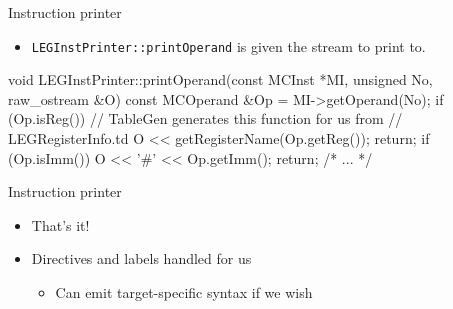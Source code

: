 
\begin{frame}[fragile]{Instruction printer}

\begin{itemize}
    \item \texttt{LEGInstPrinter::printOperand} is given the stream to print to.
\end{itemize}

\begin{codebox}
void LEGInstPrinter::printOperand(const MCInst *MI, unsigned No,
                                  raw_ostream &O) {
  const MCOperand &Op = MI->getOperand(No);
  if (Op.isReg()) {
    // TableGen generates this function for us from   
    // LEGRegisterInfo.td
    O << getRegisterName(Op.getReg());
    return;
  }
  if (Op.isImm()) {
    O << '#' << Op.getImm();
    return;
  }
  /* ... */
}
\end{codebox}

\end{frame}


\begin{frame}{Instruction printer}

\begin{itemize}
    \item That's it!
    \item Directives and labels handled for us
    \begin{itemize}
        \item Can emit target-specific syntax if we wish
    \end{itemize}
\end{itemize}


\end{frame}
